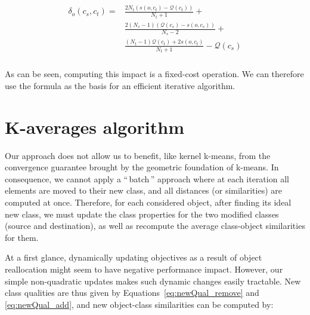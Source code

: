 \documentclass[twoside,11pt]{article}
\newcommand{\gl}[1]{``\,#1\,''} %
\begin{document}
\begin{align}
\begin{split}
  \delta_o(c_s, c_t) = & \frac{2N_t \left(s\left(o, c_t\right)-\mathcal{Q}(c_t)\right)}{N_t+1} + \\
&  \frac{2(N_s-1)\left( \mathcal{Q}(c_s) - s\left(o, c_s\right)\right)}{N_s-2}  + \\
 &  \frac{(N_t-1) \mathcal{Q}(c_t)  + 2s\left(o, c_t\right)}{N_t+1} - \mathcal{Q}(c_s) \\
\end{split}
  \label{eq:impact_classnorm}
\end{align}

As can be seen, computing this impact is a fixed-cost operation. We can therefore use the formula as the basis for an efficient iterative algorithm.

\section{K-averages algorithm}
\label{sec:algo}

Our approach does not allow us to benefit, like kernel k-means, from the convergence guarantee brought by the geometric foundation of k-means. In consequence, we cannot apply a \gl{batch} approach where at each iteration all elements are moved to their new class, and all distances (or similarities) are computed at once. Therefore, for each considered object, after finding its ideal new class, we must update the class properties for the two modified classes (source and destination), as well as recompute the average class-object similarities for them.

At a first glance, dynamically updating objectives as a result of object reallocation might seem to have negative performance impact. However, our simple non-quadratic updates makes such dynamic changes easily tractable. New class qualities are thus given by Equations~\ref{eq:newQual_remove} and \ref{eq:newQual_add}, and new object-class similarities can be computed by:

\end{document}
